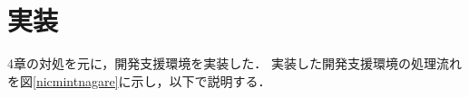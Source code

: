 \documentclass[submit,techreq,noauthor,dvipdfmx]{ipsj}
\begin{document}

\section{実装}\label{chap:implemantation}

4章の対処を元に，開発支援環境を実装した．
実装した開発支援環境の処理流れを図\ref{nicmintnagare}に示し，以下で説明する．
\end{document}
